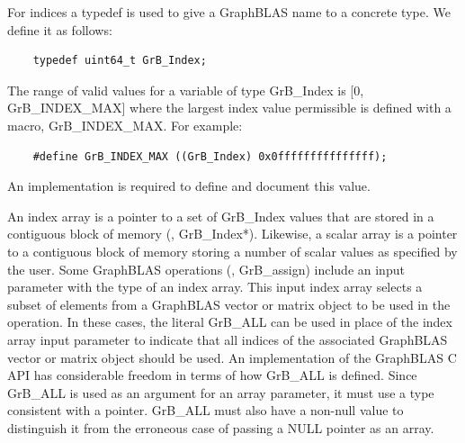 For indices a {\sf typedef} is used to give a GraphBLAS name to a concrete type. We define it as follows:
\begin{verbatim}
    typedef uint64_t GrB_Index;
\end{verbatim}
The range of valid values for a variable of type {\sf GrB\_Index} is [0, {\sf GrB\_INDEX\_MAX}] 
where the largest index value permissible is defined with a macro, {\sf GrB\_INDEX\_MAX}. For example:
\begin{verbatim}
    #define GrB_INDEX_MAX ((GrB_Index) 0x0fffffffffffffff);
\end{verbatim}
An implementation is required to define and document this value.

An index array is a pointer to a set of {\sf GrB\_Index} values that are 
stored in a contiguous block of memory (\ie, {\sf GrB\_Index*}).
Likewise, a scalar array is a pointer to a contiguous block of memory 
storing a number of scalar values as specified by the user.
Some GraphBLAS operations (\eg, {\sf GrB\_assign})  include an input parameter with the type of an index array. 
This input index array selects a subset of elements from a GraphBLAS vector or matrix object to be used in the operation.
In these cases, the literal {\sf GrB\_ALL} 
can be used in place of the index array input parameter to indicate that all indices 
of the associated GraphBLAS vector or matrix object should be used.
An implementation of the GraphBLAS C API has considerable 
freedom in terms of how {\sf GrB\_ALL} is defined.  Since {\sf GrB\_ALL} is used as an argument for an array 
parameter, it must use a type consistent with a pointer. {\sf GrB\_ALL} must also have a non-null
value to distinguish it from the erroneous case of passing a {\sf NULL} pointer as an array.

